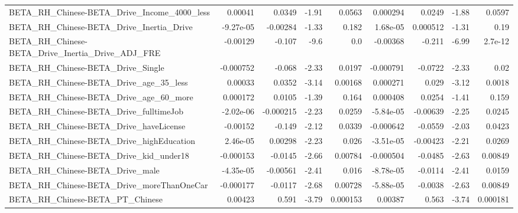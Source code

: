 \begin{tabular}{lrrrrrrrr}
BETA\_RH\_Chinese-BETA\_Drive\_Income\_4000\_less        &     0.00041 &       0.0349 &    -1.91 &   0.0563 &   0.000294 &      0.0249 &        -1.88 &        0.0597 \\
BETA\_RH\_Chinese-BETA\_Drive\_Inertia\_Drive           &   -9.27e-05 &     -0.00284 &    -1.33 &    0.182 &   1.68e-05 &    0.000512 &        -1.31 &          0.19 \\
BETA\_RH\_Chinese-BETA\_Drive\_Inertia\_Drive\_ADJ\_FRE   &    -0.00129 &       -0.107 &     -9.6 &      0.0 &   -0.00368 &      -0.211 &        -6.99 &       2.7e-12 \\
BETA\_RH\_Chinese-BETA\_Drive\_Single                  &   -0.000752 &       -0.068 &    -2.33 &   0.0197 &  -0.000791 &     -0.0722 &        -2.33 &          0.02 \\
BETA\_RH\_Chinese-BETA\_Drive\_age\_35\_less             &     0.00033 &       0.0352 &    -3.14 &  0.00168 &   0.000271 &       0.029 &        -3.12 &        0.0018 \\
BETA\_RH\_Chinese-BETA\_Drive\_age\_60\_more             &    0.000172 &       0.0105 &    -1.39 &    0.164 &   0.000408 &      0.0254 &        -1.41 &         0.159 \\
BETA\_RH\_Chinese-BETA\_Drive\_fulltimeJob             &   -2.02e-06 &    -0.000215 &    -2.23 &   0.0259 &  -5.84e-05 &    -0.00639 &        -2.25 &        0.0245 \\
BETA\_RH\_Chinese-BETA\_Drive\_haveLicense             &    -0.00152 &       -0.149 &    -2.12 &   0.0339 &  -0.000642 &     -0.0559 &        -2.03 &        0.0423 \\
BETA\_RH\_Chinese-BETA\_Drive\_highEducation           &    2.46e-05 &      0.00298 &    -2.23 &    0.026 &  -3.51e-05 &    -0.00423 &        -2.21 &        0.0269 \\
BETA\_RH\_Chinese-BETA\_Drive\_kid\_under18             &   -0.000153 &      -0.0145 &    -2.66 &  0.00784 &  -0.000504 &     -0.0485 &        -2.63 &       0.00849 \\
BETA\_RH\_Chinese-BETA\_Drive\_male                    &   -4.35e-05 &     -0.00561 &    -2.41 &    0.016 &  -8.78e-05 &     -0.0114 &        -2.41 &        0.0159 \\
BETA\_RH\_Chinese-BETA\_Drive\_moreThanOneCar          &   -0.000177 &      -0.0117 &    -2.68 &  0.00728 &  -5.88e-05 &     -0.0038 &        -2.63 &       0.00849 \\
BETA\_RH\_Chinese-BETA\_PT\_Chinese                    &     0.00423 &        0.591 &    -3.79 & 0.000153 &    0.00387 &       0.563 &        -3.74 &      0.000181 \\

\end{tabular}
